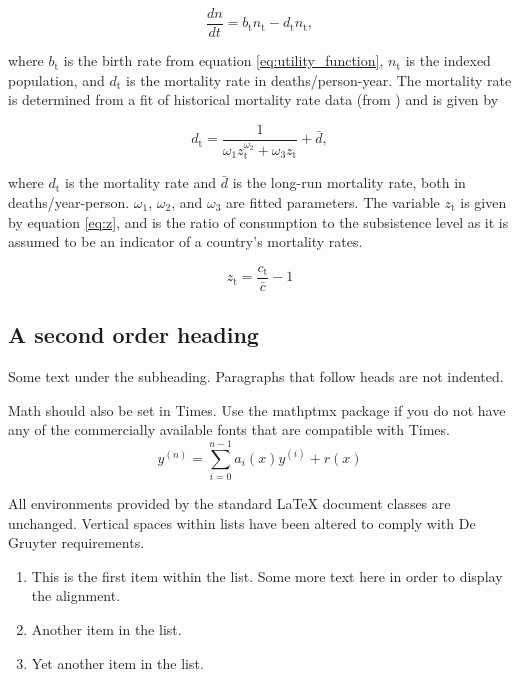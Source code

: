 \documentclass[letterpaper,12pt]{article}
\begin{document}
\begin{equation} \label{eq:dn_dt}
	\frac{dn}{dt} = b_\mathrm{t} n_\mathrm{t} - d_\mathrm{t} n_\mathrm{t},
\end{equation}

\noindent where $b_\mathrm{t}$ is the birth rate from equation \ref{eq:utility_function}, $n_\mathrm{t}$ is the indexed population, and $d_\mathrm{t}$ is the mortality rate in deaths/person-year. The mortality rate is determined from a fit of historical mortality rate data (from \citet{Jones2001}) and is given by

\begin{equation} \label{eq:mortality_rate}
	d_\mathrm{t} = \frac{1}{\omega_\mathrm{1} z_\mathrm{t}^{\omega_\mathrm{2}} + \omega_\mathrm{3} z_\mathrm{t}} + \bar d,
\end{equation}

\noindent where $d_\mathrm{t}$ is the mortality rate and $\bar d$ is the long-run mortality rate, both in deaths/year-person. $\omega_\mathrm{1}$, $\omega_\mathrm{2}$, and $\omega_\mathrm{3}$ are fitted parameters. The variable $z_\mathrm{t}$ is given by equation \ref{eq:z}, and is the ratio of consumption to the subsistence level as it is assumed to be an indicator of a country's mortality rates.

\begin{equation} \label{eq:z}
	z_\mathrm{t} = \frac{c_\mathrm{t}}{\bar c} - 1
\end{equation}



\subsection{A second order heading}

Some text under the subheading. Paragraphs that follow heads are not
indented.

Math should also be set in Times. Use the mathptmx package if you do not have
any of the commercially available fonts that are compatible with Times.
\begin{equation}
    y^{(n)} = \sum_{i=0}^{n-1} a_i(x) y^{(i)} + r(x) 
\end{equation}

All environments provided by the standard LaTeX document classes are
unchanged. Vertical spaces within lists have been altered to comply with De Gruyter
requirements.
\begin{enumerate}
\item This is the first item within the list. Some more text here in order to display the alignment.
\item Another item in the list.
\item Yet another item in the list.
\end{enumerate}
\end{document}

